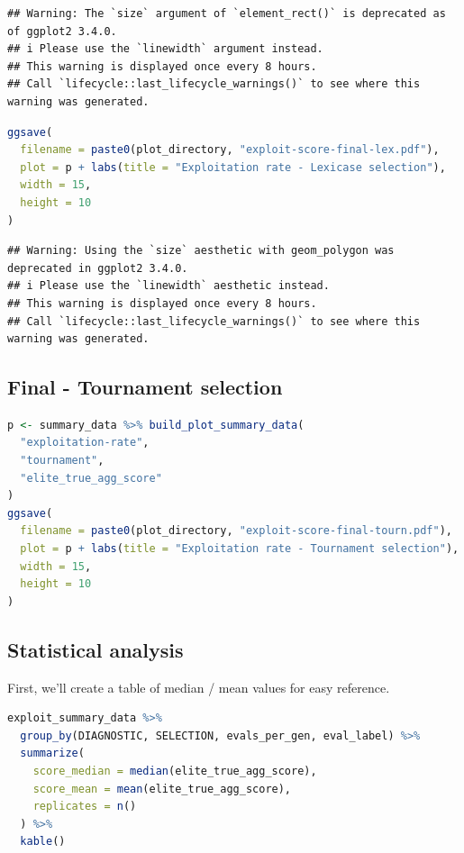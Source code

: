 \documentclass[
]{book}
\begin{document}
\begin{lstlisting}
## Warning: The `size` argument of `element_rect()` is deprecated as of ggplot2 3.4.0.
## i Please use the `linewidth` argument instead.
## This warning is displayed once every 8 hours.
## Call `lifecycle::last_lifecycle_warnings()` to see where this warning was generated.
\end{lstlisting}

\begin{lstlisting}[language=R]
ggsave(
  filename = paste0(plot_directory, "exploit-score-final-lex.pdf"),
  plot = p + labs(title = "Exploitation rate - Lexicase selection"),
  width = 15,
  height = 10
)
\end{lstlisting}

\begin{lstlisting}
## Warning: Using the `size` aesthetic with geom_polygon was deprecated in ggplot2 3.4.0.
## i Please use the `linewidth` aesthetic instead.
## This warning is displayed once every 8 hours.
## Call `lifecycle::last_lifecycle_warnings()` to see where this warning was generated.
\end{lstlisting}

\hypertarget{final---tournament-selection}{%
\subsection{Final - Tournament selection}\label{final---tournament-selection}}

\begin{lstlisting}[language=R]
p <- summary_data %>% build_plot_summary_data(
  "exploitation-rate",
  "tournament",
  "elite_true_agg_score"
)
ggsave(
  filename = paste0(plot_directory, "exploit-score-final-tourn.pdf"),
  plot = p + labs(title = "Exploitation rate - Tournament selection"),
  width = 15,
  height = 10
)
\end{lstlisting}

\hypertarget{statistical-analysis}{%
\subsection{Statistical analysis}\label{statistical-analysis}}

First, we'll create a table of median / mean values for easy reference.

\begin{lstlisting}[language=R]
exploit_summary_data %>%
  group_by(DIAGNOSTIC, SELECTION, evals_per_gen, eval_label) %>%
  summarize(
    score_median = median(elite_true_agg_score),
    score_mean = mean(elite_true_agg_score),
    replicates = n()
  ) %>%
  kable()
\end{lstlisting}
\end{document}
